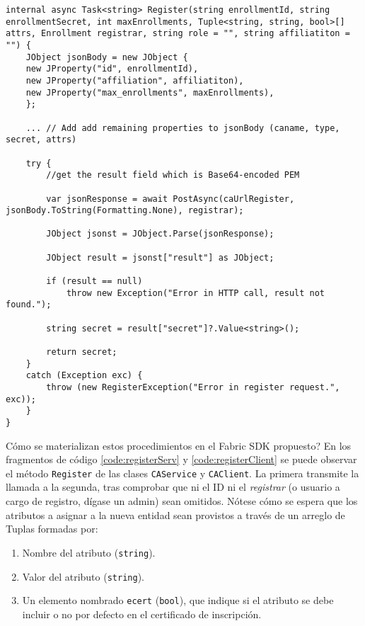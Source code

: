 \begin{lstlisting}[caption={M\'etodo \texttt{Register} de la clase \texttt{CAClient}.}, label={code:registerClient}]
internal async Task<string> Register(string enrollmentId, string enrollmentSecret, int maxEnrollments, Tuple<string, string, bool>[] attrs, Enrollment registrar, string role = "", string affiliatiton = "") {
	JObject jsonBody = new JObject {
	new JProperty("id", enrollmentId),
	new JProperty("affiliation", affiliatiton),
	new JProperty("max_enrollments", maxEnrollments),
	};

	... // Add add remaining properties to jsonBody (caname, type, secret, attrs)

	try {
		//get the result field which is Base64-encoded PEM
		
		var jsonResponse = await PostAsync(caUrlRegister, jsonBody.ToString(Formatting.None), registrar);

		JObject jsonst = JObject.Parse(jsonResponse);

		JObject result = jsonst["result"] as JObject;

		if (result == null)
			throw new Exception("Error in HTTP call, result not found.");

		string secret = result["secret"]?.Value<string>();

		return secret;
	}
	catch (Exception exc) {
		throw (new RegisterException("Error in register request.", exc));
	}
}
\end{lstlisting}

C\'omo se materializan estos procedimientos en el Fabric SDK propuesto? En los fragmentos de c\'odigo \ref{code:registerServ} y \ref{code:registerClient} se puede observar el m\'etodo \texttt{Register} de las clases \texttt{CAService} y \texttt{CAClient}. La primera transmite la llamada a la segunda, tras comprobar que ni el ID ni el \emph{registrar} (o usuario a cargo de registro, d\'igase un admin) sean omitidos. N\'otese c\'omo se espera que los atributos a asignar a la nueva entidad sean provistos a trav\'es de un arreglo de Tuplas formadas por:

\begin{enumerate}
	\item Nombre del atributo (\texttt{string}).
	
	\item Valor del atributo (\texttt{string}).
	
	\item Un elemento nombrado \texttt{ecert} (\texttt{bool}), que indique si el atributo se debe incluir o no por defecto en el certificado de inscripción.
\end{enumerate}

